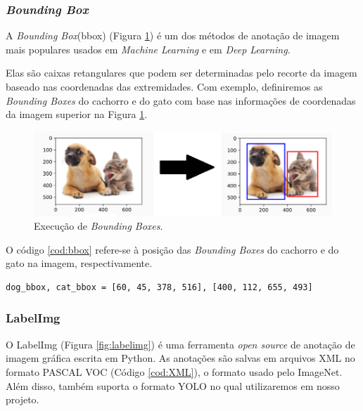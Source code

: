 \subsubsection*{\textit{Bounding Box}}

A \textit{Bounding Box}(bbox) (Figura \ref{fig:boundingBox}) é um dos métodos de anotação de imagem mais populares usados em \textit{Machine Learning} e em \textit{Deep Learning}.

Elas são caixas retangulares que podem ser determinadas pelo recorte da imagem baseado nas coordenadas das extremidades. Com exemplo, definiremos as \textit{Bounding Boxes} do cachorro e do gato com base nas informações de coordenadas da imagem superior na Figura \ref{fig:boundingBox}. \cite{allDeep}

\begin{figure}[htbp]
		\centering
		\includegraphics[scale=0.6]{figuras/MachineLearning/catDog.png}
		\caption{Execução de \textit{Bounding Boxes}.}
		\label{fig:boundingBox}
\end{figure}

O código \ref{cod:bbox} refere-se à posição das \textit{Bounding Boxes} do cachorro e do gato na imagem, respectivamente.

\begin{lstlisting}[caption=Posições de X e Y nas \textit{Bounding Boxes}, label=cod:bbox]
         dog_bbox, cat_bbox = [60, 45, 378, 516], [400, 112, 655, 493]
\end{lstlisting}


\subsubsection*{LabelImg}\label{sub:LabelImg}

O LabelImg (Figura \ref{fig:labelimg}) é uma ferramenta \textit{open source} de anotação de imagem gráfica escrita em Python. As anotações são salvas em arquivos XML no formato PASCAL VOC (Código \ref{cod:XML}), o formato usado pelo ImageNet. Além disso, também suporta o formato YOLO no qual utilizaremos em nosso projeto. \cite{labelimg}

